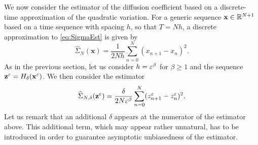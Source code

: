 \documentclass[10pt]{article}
\begin{document}
We now consider the estimator of the diffusion coefficient based on a discrete-time approximation of the quadratic variation. For a generic sequence $\mathbf x\in \mathbb{R}^{N+1}$ based on a time sequence with spacing $h$, so that $T = Nh$, a discrete approximation to \eqref{eq:SigmaEst} is given by
\begin{equation}
	\widehat \Sigma_{N}(\mathbf x) = \frac{1}{2Nh} \sum_{n=0}^N (x_{n+1}- x_n)^2.
\end{equation}
As in the previous section, let us consider $h = \varepsilon^\beta$ for $\beta \geq 1$ and the sequence $\mathbf z^\varepsilon = H_\delta(\mathbf x^\varepsilon)$. We then consider the estimator 
\begin{equation}\label{eq:SigmaEstDiscrete}
	\widehat \Sigma_{N, \delta}(\mathbf z^\varepsilon) = \frac{\delta}{2N\varepsilon^\beta} \sum_{n=0}^N (z^\varepsilon_{n+1} - z^\varepsilon_n)^2.
\end{equation}
Let us remark that an additional $\delta$ appears at the numerator of the estimator above. This additional term, which may appear rather unnatural, has to be introduced in order to guarantee asymptotic unbiasedness of the estimator.
\end{document}
